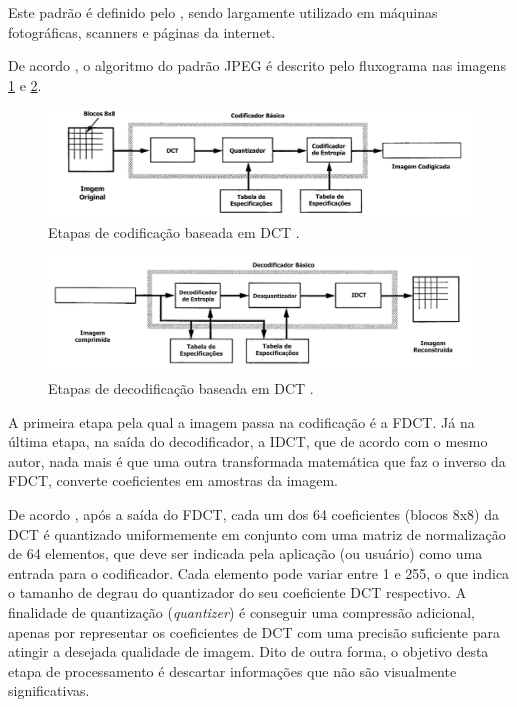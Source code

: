 Este padrão é definido pelo \cite{T.81}, sendo largamente utilizado em máquinas fotográficas, scanners e páginas da internet. 

De acordo \cite{wallace1991jpeg}, o algoritmo do padrão JPEG é descrito pelo fluxograma nas imagens \ref{ENCODER_JPEG} e \ref{DECODER_JPEG}.

\begin{figure}[h]
	\centering
	\includegraphics[scale=0.55]{figuras/ENCODER-JPEG.pdf}
	\caption{Etapas de codificação baseada em DCT \cite{wallace1991jpeg}.}
	\label{ENCODER_JPEG}
\end{figure}

\begin{figure}[h]
	\centering
	\includegraphics[scale=0.55]{figuras/DECODER-JPEG.pdf}
	\caption{Etapas de decodificação baseada em DCT \cite{wallace1991jpeg}.}
	\label{DECODER_JPEG}
\end{figure}
  
 A primeira etapa pela qual a imagem passa na codificação é a FDCT. Já na última etapa, na saída do decodificador, a IDCT, que de acordo com o mesmo autor, nada mais é que uma outra transformada matemática que faz o inverso da FDCT, converte coeficientes em amostras da imagem. 

De acordo \cite{wallace1991jpeg}, após a saída do FDCT, cada um dos 64 coeficientes (blocos 8x8) da DCT  é quantizado uniformemente em conjunto com uma matriz de normalização de 64 elementos, que deve ser indicada pela aplicação (ou usuário) como uma entrada para o codificador. Cada elemento pode variar entre 1 e 255, o que indica o tamanho de degrau do quantizador do seu coeficiente DCT respectivo. A finalidade de quantização (\textit{quantizer}) é conseguir uma compressão adicional, apenas por representar os coeficientes de DCT com uma precisão suficiente para atingir a desejada qualidade de imagem. Dito de outra forma, o objetivo desta etapa de processamento é descartar informações que não são visualmente significativas. 

